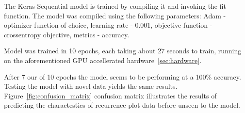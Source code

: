 \documentclass[a4paper,12pt,fleqn]{article}
\begin{document}
The Keras Sequential model is trained by compiling it and invoking the fit function.
The model was compiled using the following parameters: Adam - optimizer function of choice, learning rate - 0.001, objective function - crossentropy objective, metrics - accuracy.

Model was trained in 10 epochs, each taking about 27 seconds to train, running on the aforementioned GPU accellerated hardware~\ref{sec:hardware}.

After 7 our of 10 epochs the model seems to be performing at a 100\% accuracy.
Testing the model with novel data yields the same results.
Figure~\ref{fig:confusion_matrix} confusion matrix illustrates the results of predicting the charactestics of recurrence plot data before unseen to the model.















\end{document}
